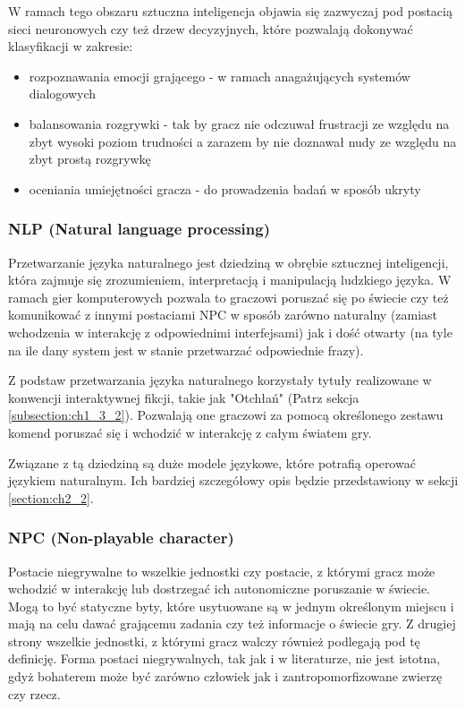 W ramach tego obszaru sztuczna inteligencja objawia się zazwyczaj pod postacią sieci neuronowych czy
też drzew decyzyjnych, które pozwalają dokonywać klasyfikacji w zakresie\cite{reusable_game_ai}:

\begin{itemize}
    \item rozpoznawania emocji grającego - w ramach anagażujących systemów dialogowych
    \item balansowania rozgrywki - tak by gracz nie odczuwał frustracji ze względu na zbyt wysoki poziom
          trudności a zarazem by nie doznawał nudy ze względu na zbyt prostą rozgrywkę
    \item oceniania umiejętności gracza - do prowadzenia badań w sposób ukryty
\end{itemize}

\subsubsection*{NLP (Natural language processing)}

Przetwarzanie języka naturalnego jest dziedziną w obrębie sztucznej inteligencji, która zajmuje się
zrozumieniem, interpretacją i manipulacją ludzkiego języka\cite{reusable_game_ai}. W ramach gier
komputerowych pozwala to graczowi poruszać się po świecie czy też komunikować z innymi postaciami NPC
w sposób zarówno naturalny (zamiast wchodzenia w interakcję z odpowiednimi interfejsami) jak i dość
otwarty (na tyle na ile dany system jest w stanie przetwarzać odpowiednie frazy).

Z podstaw przetwarzania języka naturalnego korzystały tytuły realizowane w konwencji interaktywnej
fikcji, takie jak "Otchłań" (Patrz sekcja \ref{subsection:ch1_3_2}). Pozwalają one graczowi za pomocą
określonego zestawu komend poruszać się i wchodzić w interakcję z całym światem gry.

Związane z tą dziedziną są duże modele językowe, które potrafią operować językiem naturalnym.
Ich bardziej szczegółowy opis będzie przedstawiony w sekcji \ref{section:ch2_2}.

\subsubsection*{NPC (Non-playable character)}

Postacie niegrywalne to wszelkie jednostki czy postacie, z którymi gracz może wchodzić w
interakcję lub dostrzegać ich autonomiczne poruszanie w świecie. Mogą to być statyczne byty,
które usytuowane są w jednym określonym miejscu i mają na celu dawać grającemu zadania czy też
informacje o świecie gry. Z drugiej strony wszelkie jednostki, z którymi gracz walczy również
podlegają pod tę definicję. Forma postaci niegrywalnych, tak jak i w literaturze, nie jest
istotna, gdyż bohaterem może być zarówno człowiek jak i zantropomorfizowane zwierzę czy rzecz.

